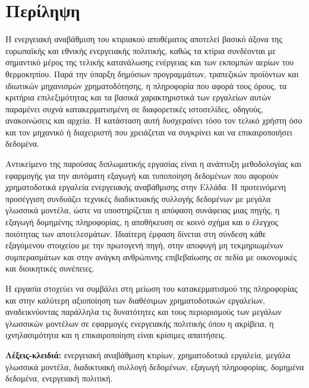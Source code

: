 \chapter*{Περίληψη}

Η ενεργειακή αναβάθμιση του κτιριακού αποθέματος αποτελεί βασικό άξονα της
ευρωπαϊκής και εθνικής ενεργειακής πολιτικής, καθώς τα κτίρια συνδέονται με
σημαντικό μέρος της τελικής κατανάλωσης ενέργειας και των εκπομπών αερίων του
θερμοκηπίου. Παρά την ύπαρξη δημόσιων προγραμμάτων, τραπεζικών προϊόντων και
ιδιωτικών μηχανισμών χρηματοδότησης, η πληροφορία που αφορά τους όρους, τα
κριτήρια επιλεξιμότητας και τα βασικά χαρακτηριστικά των εργαλείων αυτών
παραμένει συχνά κατακερματισμένη σε διαφορετικές ιστοσελίδες, οδηγούς,
ανακοινώσεις και αρχεία. Η κατάσταση αυτή δυσχεραίνει τόσο τον τελικό χρήστη
όσο και τον μηχανικό ή διαχειριστή που χρειάζεται να συγκρίνει και να
επικαιροποιήσει δεδομένα.

Αντικείμενο της παρούσας διπλωματικής εργασίας είναι η ανάπτυξη μεθοδολογίας
και εφαρμογής για την αυτόματη εξαγωγή και τυποποίηση δεδομένων που αφορούν
χρηματοδοτικά εργαλεία ενεργειακής αναβάθμισης στην Ελλάδα. Η προτεινόμενη
προσέγγιση συνδυάζει τεχνικές διαδικτυακής συλλογής δεδομένων με μεγάλα
γλωσσικά μοντέλα, ώστε να υποστηρίζεται η απόφαση συνάφειας μιας πηγής, η
εξαγωγή δομημένης πληροφορίας, η αποθήκευση σε κοινό σχήμα και ο έλεγχος
ποιότητας των αποτελεσμάτων. Ιδιαίτερη έμφαση δίνεται στη σύνδεση κάθε
εξαγόμενου στοιχείου με την πρωτογενή πηγή, στην αποφυγή μη τεκμηριωμένων
συμπερασμάτων και στην ανάγκη ανθρώπινης επιβεβαίωσης σε πεδία με οικονομικές
και διοικητικές συνέπειες.

Η εργασία στοχεύει να συμβάλει στη μείωση του κατακερματισμού της πληροφορίας
και στην καλύτερη αξιοποίηση των διαθέσιμων χρηματοδοτικών εργαλείων,
αναδεικνύοντας παράλληλα τις δυνατότητες και τους περιορισμούς των μεγάλων
γλωσσικών μοντέλων σε εφαρμογές ενεργειακής πολιτικής όπου η ακρίβεια, η
ιχνηλασιμότητα και η επικαιροποίηση είναι κρίσιμες απαιτήσεις.

\vspace{0.8cm}
\noindent\textbf{Λέξεις-κλειδιά:} ενεργειακή αναβάθμιση κτιρίων, χρηματοδοτικά
εργαλεία, μεγάλα γλωσσικά μοντέλα, διαδικτυακή συλλογή δεδομένων, εξαγωγή
πληροφορίας, δομημένα δεδομένα, ενεργειακή πολιτική.
\clearpage
